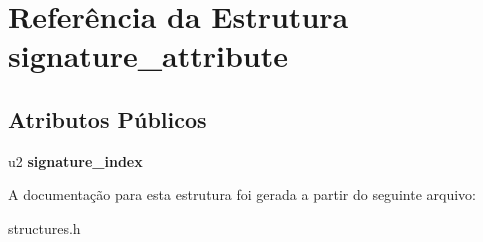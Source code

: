 \hypertarget{structsignature__attribute}{}\section{Referência da Estrutura signature\+\_\+attribute}
\label{structsignature__attribute}
\subsection*{Atributos Públicos}
\begin{DoxyCompactItemize}
\item 
\mbox{\label{structsignature__attribute_a63a67e73289180add457fbc0ae36413f}} 
u2 {\bfseries signature\+\_\+index}
\end{DoxyCompactItemize}


A documentação para esta estrutura foi gerada a partir do seguinte arquivo\+:\begin{DoxyCompactItemize}
\item 
structures.\+h\end{DoxyCompactItemize}
